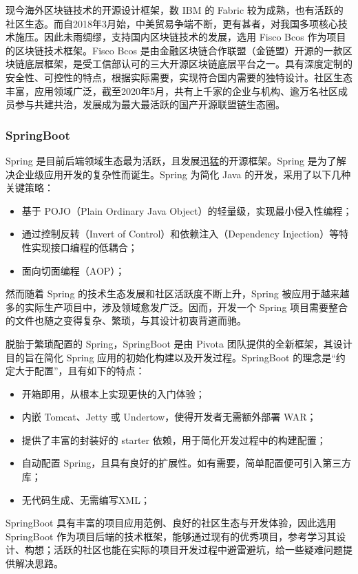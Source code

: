现今海外区块链技术的开源设计框架，数 IBM 的 Fabric 较为成熟，也有活跃的社区生态。而自2018年3月始，中美贸易争端不断，更有甚者，对我国多项核心技术施压。因此未雨绸缪，支持国内区块链技术的发展，选用 Fisco Bcos 作为项目的区块链技术框架。Fisco Bcos 是由金融区块链合作联盟（金链盟）开源的一款区块链底层框架，是受工信部认可的三大开源区块链底层平台之一。具有深度定制的安全性、可控性的特点，根据实际需要，实现符合国内需要的独特设计。社区生态丰富，应用领域广泛，截至2020年5月，共有上千家的企业与机构、逾万名社区成员参与共建共治，发展成为最大最活跃的国产开源联盟链生态圈。

\subsubsection{SpringBoot}
Spring 是目前后端领域生态最为活跃，且发展迅猛的开源框架。Spring 是为了解决企业级应用开发的复杂性而诞生。Spring 为简化 Java 的开发，采用了以下几种关键策略：
\begin{itemize}
    \item 基于 POJO（Plain Ordinary Java Object）的轻量级，实现最小侵入性编程；
    \item 通过控制反转（Invert of Control）和依赖注入（Dependency Injection）等特性实现接口编程的低耦合；
    \item 面向切面编程（AOP）；
\end{itemize}
然而随着 Spring 的技术生态发展和社区活跃度不断上升，Spring 被应用于越来越多的实际生产项目中，涉及领域愈发广泛。因而，开发一个 Spring 项目需要整合的文件也随之变得复杂、繁琐，与其设计初衷背道而驰。

脱胎于繁琐配置的 Spring，SpringBoot 是由 Pivota 团队提供的全新框架，其设计目的旨在简化 Spring 应用的初始化构建以及开发过程。SpringBoot 的理念是“约定大于配置”，且有如下的特点：
\begin{itemize}
    \item 开箱即用，从根本上实现更快的入门体验；
    \item 内嵌 Tomcat、Jetty 或 Undertow，使得开发者无需额外部署 WAR；
    \item 提供了丰富的封装好的 starter 依赖，用于简化开发过程中的构建配置；
    \item 自动配置 Spring，且具有良好的扩展性。如有需要，简单配置便可引入第三方库；
    \item 无代码生成、无需编写XML；
\end{itemize}

SpringBoot 具有丰富的项目应用范例、良好的社区生态与开发体验，因此选用 SpringBoot 作为项目后端的技术框架，能够通过现有的优秀项目，参考学习其设计、构想；活跃的社区也能在实际的项目开发过程中避雷避坑，给一些疑难问题提供解决思路。

